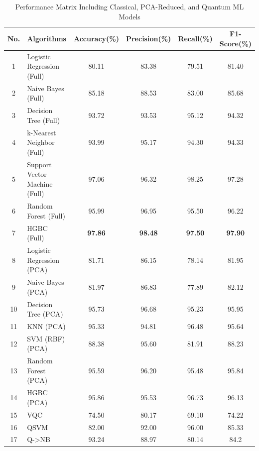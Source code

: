 \documentclass[runningheads]{llncs}
\begin{document}
\begin{table}[!ht]
    \centering
    \caption{Performance Matrix Including Classical, PCA-Reduced, and Quantum ML Models}
    \renewcommand{\arraystretch}{1.2}
    \setlength{\tabcolsep}{4pt}
    \begin{tabular}{|c|l|c|c|c|c|}
        \hline
        \textbf{No.} & \textbf{Algorithms} & \textbf{Accuracy(\%)} & \textbf{Precision(\%)} & \textbf{Recall(\%)} & \textbf{F1-Score(\%)} \\
        \hline
          1  & Logistic Regression (Full) & 80.11 & 83.38 & 79.51 & 81.40 \\
          \hline
          2 & Naive Bayes (Full) & 85.18 & 88.53 & 83.00 & 85.68 \\
          \hline
          3 & Decision Tree (Full) & 93.72 & 93.53 & 95.12 & 94.32 \\
          \hline
          4 & k-Nearest Neighbor (Full) & 93.99 & 95.17 & 94.30 & 94.33 \\
          \hline
          5 & Support Vector Machine (Full) & 97.06 & 96.32 & 98.25 & 97.28 \\
          \hline
          6 & Random Forest (Full) & 95.99 & 96.95 & 95.50 & 96.22 \\
          \hline
          7 & HGBC (Full) & \textbf{97.86} & \textbf{98.48} & \textbf{97.50} & \textbf{97.90} \\
          \hline
          8 & Logistic Regression (PCA) & 81.71 & 86.15 & 78.14 & 81.95 \\
          \hline
          9 & Naive Bayes (PCA) & 81.97 & 86.83 & 77.89 & 82.12 \\
          \hline
          10 & Decision Tree (PCA) & 95.73 & 96.68 & 95.23 & 95.95 \\
          \hline
          11 & KNN (PCA) & 95.33 & 94.81 & 96.48 & 95.64 \\
          \hline
          12 & SVM (RBF) (PCA) & 88.38 & 95.60 & 81.91 & 88.23 \\
          \hline
          13 & Random Forest (PCA) & 95.59 & 96.20 & 95.48 & 95.84 \\
          \hline
          14 & HGBC (PCA) & 95.86 & 95.53 & 96.73 & 96.13 \\
          \hline
          15 & VQC & 74.50 & 80.17 & 69.10 & 74.22 \\
          \hline
          16 & QSVM & 82.00 & 92.00 & 96.00 & 85.33 \\
          \hline
          17 & Q->NB & 93.24 & 88.97 & 80.14 & 84.2 \\
          \hline
    \end{tabular}
    \label{tab:Performance_Matrix_Combined}
\end{table}
\end{document}
